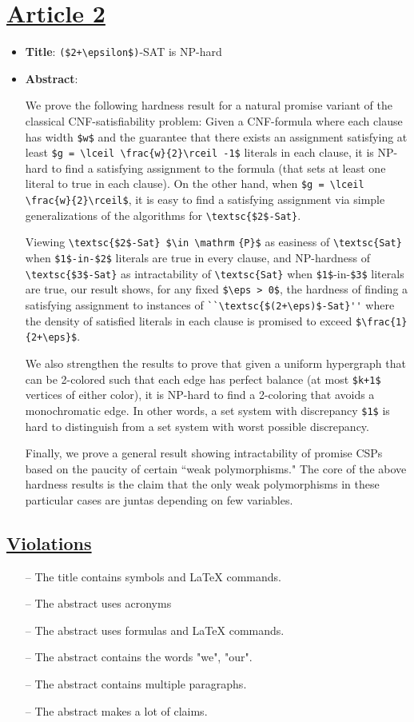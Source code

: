 \documentclass[11pt,twocolumn]{article}
\begin{document}
\section{\underline{Article 2}}
\begin{itemize}
	\item {\bf{Title}}: \verb|($2+\epsilon$)|-SAT is NP-hard
	\item {\bf{Abstract}}:

We prove the following hardness result for a natural promise variant of the classical CNF-satisfiability problem: Given a CNF-formula where each clause has width \verb|$w$| and the guarantee that there exists an assignment satisfying at least \verb|$g = \lceil \frac{w}{2}\rceil -1$| literals in each clause, it is NP-hard to find a satisfying assignment to the formula (that sets at least one literal to true in each clause). On the other hand, when \verb|$g = \lceil \frac{w}{2}\rceil$|, it is easy to find a satisfying assignment via simple generalizations of the algorithms for \verb|\textsc{$2$-Sat}|.	

Viewing \verb|\textsc{$2$-Sat} $\in \mathrm| \verb|{P}$| as easiness of \verb|\textsc{Sat}| when \verb|$1$-in-$2$| literals are true in every clause, and NP-hardness of \verb|\textsc{$3$-Sat}| as intractability of \verb|\textsc{Sat}| when \verb|$1$|-in-\verb|$3$| literals are true, our result shows, for any fixed \verb|$\eps > 0$|, the hardness of finding a satisfying assignment to instances of \verb|``\textsc{$(2+\eps)$-Sat}''| where the density of satisfied literals in each clause is promised to exceed \verb|$\frac{1}{2+\eps}$|.

We also strengthen the results to prove that given a uniform hypergraph that can be 2-colored such that each edge has perfect balance (at most \verb|$k+1$| vertices of either color), it is NP-hard to find a 2-coloring that avoids a monochromatic edge. In other words, a set system with discrepancy \verb|$1$| is hard to distinguish from a set system with worst possible discrepancy.

Finally, we prove a general result showing intractability of promise CSPs based on the paucity of certain ``weak polymorphisms." The core of the above hardness results is the claim that the only weak polymorphisms in these particular cases are juntas depending on few variables.
\end{itemize}

\subsection {\underline{Violations}}
\begin{itemize}
	\item[--] The title contains symbols and {\LaTeX} commands.
	\item[--] The abstract uses acronyms
	\item[--] The abstract uses formulas and {\LaTeX} commands.
	\item[--] The abstract contains the words "we", "our".
	\item[--] The abstract contains multiple paragraphs.
	\item[--] The abstract makes a lot of claims.
\end{itemize}
\end{document}
